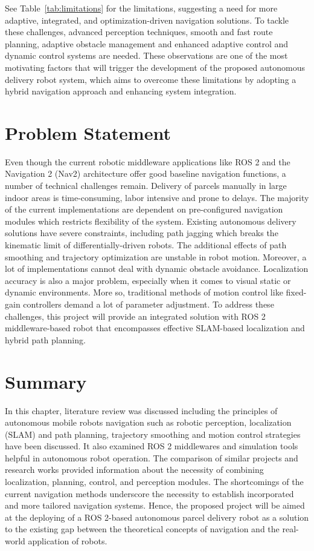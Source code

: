 See Table~\ref{tab:limitations} for the limitations, suggesting a need for more adaptive, integrated, and optimization-driven navigation solutions. To tackle these challenges, advanced perception techniques, smooth and fast route planning, adaptive obstacle management and enhanced adaptive control and dynamic control systems are needed. These observations are one of the most motivating factors that will trigger the development of the proposed autonomous delivery robot system, which aims to overcome these limitations by adopting a hybrid navigation approach and enhancing system integration.

\section{Problem Statement}

Even though the current robotic middleware applications like ROS 2 and the Navigation 2 (Nav2) architecture offer good baseline navigation functions, a number of technical challenges remain. Delivery of parcels manually in large indoor areas is time-consuming, labor intensive and prone to delays. The majority of the current implementations are dependent on pre-configured navigation modules which restricts flexibility of the system. Existing autonomous delivery solutions have severe constraints, including path jagging which breaks the kinematic limit of differentially-driven robots. The additional effects of path smoothing and trajectory optimization are unstable in robot motion. Moreover, a lot of implementations cannot deal with dynamic obstacle avoidance. Localization accuracy is also a major problem, especially when it comes to visual static or dynamic environments. More so, traditional methods of motion control like fixed-gain controllers demand a lot of parameter adjustment. To address these challenges, this project will provide an integrated solution with ROS 2 middleware-based robot that encompasses effective SLAM-based localization and hybrid path planning.

\section{Summary}

In this chapter, literature review was discussed including the principles of autonomous mobile robots navigation such as robotic perception, localization (SLAM) and path planning, trajectory smoothing and motion control strategies have been discussed. It also examined ROS 2 middlewares and simulation tools helpful in autonomous robot operation. The comparison of similar projects and research works provided information about the necessity of combining localization, planning, control, and perception modules. The shortcomings of the current navigation methods underscore the necessity to establish incorporated and more tailored navigation systems. Hence, the proposed project will be aimed at the deploying of a ROS 2-based autonomous parcel delivery robot as a solution to the existing gap between the theoretical concepts of navigation and the real-world application of robots.